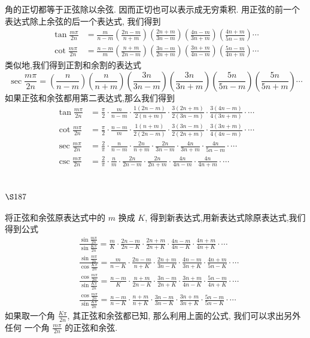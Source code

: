 角的正切都等于正弦除以余弦. 因而正切也可以表示成无穷乘积. 用正弦的前一个 表达式除上余弦的后一个表达式, 我们得到
\[
\begin{aligned}
\tan \frac{m \pi}{2 n} & =\frac{m}{n-m}\left(\frac{2 n-m}{n+m}\right)\left(\frac{2 n+m}{3 n-m}\right)\left(\frac{4 n-m}{3 n+m}\right)\left(\frac{4 n+m}{5 n-m}\right) \cdots \\
\cot \frac{m \pi}{2 n} & =\frac{n-m}{m}\left(\frac{n+m}{2 n-m}\right)\left(\frac{3 n-m}{2 n+m}\right)\left(\frac{3 n+m}{4 n-m}\right)\left(\frac{5 n-m}{4 n+m}\right) \cdots
\end{aligned}
\]
类似地,我们得到正割和余割的表达式
\[
\sec \frac{m \pi}{2 n}=\left(\frac{n}{n-m}\right)\left(\frac{n}{n+m}\right)\left(\frac{3 n}{3 n-m}\right)\left(\frac{3 n}{3 n+m}\right)\left(\frac{5 n}{5 n-m}\right)\left(\frac{5 n}{5 n+m}\right) \cdots
\]
如果正弦和余弦都用第二表达式,那么我们得到
\[
\begin{aligned}
\tan \frac{m \pi}{2 n} & =\frac{\pi}{2} \cdot \frac{m}{n-m} \cdot \frac{1(2 n-m)}{2(n+m)} \cdot \frac{3(2 n+m)}{2(3 n-m)} \cdot \frac{3(4 n-m)}{4(3 n+m)} \cdot \cdots \\
\cot \frac{m \pi}{2 n} & =\frac{\pi}{2} \cdot \frac{n-m}{m} \cdot \frac{1(n+m)}{2(2 n-m)} \cdot \frac{3(3 n-m)}{2(2 n+m)} \cdot \frac{3(3 n+m)}{4(4 n-m)} \cdot \cdots \\
\sec \frac{m \pi}{2 n} & =\frac{2}{\pi} \cdot \frac{n}{n-m} \cdot \frac{2 n}{n+m} \cdot \frac{2 n}{3 n-m} \cdot \frac{4 n}{3 n+m} \cdot \frac{4 n}{5 n-m} \cdot \cdots \\
\csc \frac{m \pi}{2 n} & =\frac{2}{\pi} \cdot \frac{n}{m} \cdot \frac{2 n}{2 n-m} \cdot \frac{2 n}{2 n+m} \cdot \frac{4 n}{4 n-m} \cdot \frac{4 n}{4 n+m} \cdot \cdots
\end{aligned}
\]
\section{$\S 187$}

将正弦和余弦原表达式中的 $m$ 换成 $K$, 得到新表达式,用新表达式除原表达式,我们 得到公式
\[
\begin{aligned}
& \frac{\sin \frac{m \pi}{2 n}}{\sin \frac{K \pi}{2 n}}=\frac{m}{K} \cdot \frac{2 n-m}{2 n-K} \cdot \frac{2 n+m}{2 n+K} \cdot \frac{4 n-m}{4 n-K} \cdot \frac{4 n+m}{4 n+K} \cdot \cdots \\
& \frac{\sin \frac{m \pi}{2 n}}{\cos \frac{K \pi}{2 n}}=\frac{m}{n-K} \cdot \frac{2 n-m}{n+K} \cdot \frac{2 n+m}{3 n-K} \cdot \frac{4 n-m}{3 n+K} \cdot \frac{4 n+m}{5 n-K} \cdot \cdots \\
& \frac{\cos \frac{m \pi}{2 n}}{\sin \frac{K \pi}{2 n}}=\frac{n-m}{K} \cdot \frac{n+m}{2 n-K} \cdot \frac{3 n-m}{2 n+K} \cdot \frac{3 n+m}{4 n-K} \cdot \frac{5 n-m}{4 n+K} \cdot \cdots \\
& \frac{\cos \frac{m \pi}{2 n}}{\sin \frac{K \pi}{2 n}}=\frac{n-m}{n-K} \cdot \frac{n+m}{n+K} \cdot \frac{3 n-m}{3 n-K} \cdot \frac{3 n+m}{3 n+K} \cdot \frac{5 n-m}{5 n-K} \cdot \cdots
\end{aligned}
\]
如果取一个角 $\frac{K \pi}{2 n}$, 其正弦和余弦都已知, 那么利用上面的公式, 我们可以求出另外任何 一个角 $\frac{m \pi}{2 n}$ 的正弦和余弦.

